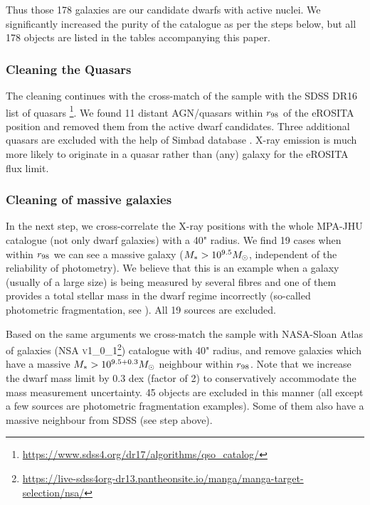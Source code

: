 \documentclass[fleqn,usenatbib]{mnras}
\newcommand{\stmass}{M_{\rm *}}
\newcommand{\msun}{M_\odot}
\begin{document}
Thus those 178 galaxies are our candidate dwarfs with active nuclei.  We significantly increased the purity of the catalogue as per the steps below, but all 178 objects are listed in the tables accompanying this paper.  


\subsubsection*{Cleaning the Quasars}


The cleaning continues with the cross-match of the sample with the SDSS DR16 list of quasars \citep{Lyke2020}\footnote{\url{https://www.sdss4.org/dr17/algorithms/qso_catalog/}}. We found 11 distant AGN/quasars within $r_{\rm 98}$ of the eROSITA position and removed them from the active dwarf candidates. Three additional quasars are excluded with the help of Simbad database \citep{Wenger2000}. X-ray emission is much more likely to originate in a quasar rather than (any) galaxy for the eROSITA flux limit. 


\subsubsection*{Cleaning of massive galaxies}


In the next step, we cross-correlate the X-ray positions with the whole MPA-JHU catalogue (not only dwarf galaxies) with a 40" radius. We find 19 cases when within $r_{\rm 98}$ we can see a massive galaxy ($\stmass > 10^{9.5} \msun$, independent of the reliability of photometry). We believe that this is an example when a galaxy (usually of a large size) is being measured by several fibres and one of them provides a total stellar mass in the dwarf regime incorrectly (so-called photometric fragmentation, see \citealt{Sartori2015, Birchall2020}). All 19 sources are excluded.


Based on the same arguments we cross-match the sample with NASA-Sloan Atlas of galaxies (NSA \textsc{v1\_0\_1}\footnote{\url{https://live-sdss4org-dr13.pantheonsite.io/manga/manga-target-selection/nsa/}}) catalogue with 40" radius, and remove galaxies which have a massive $\stmass > 10^{9.5+0.3} \msun$ neighbour within $r_{\rm 98}$. Note that we increase the dwarf mass limit by 0.3 dex (factor of 2) to conservatively accommodate the mass measurement uncertainty. 45 objects are excluded in this manner (all except a few sources are photometric fragmentation examples). Some of them also have a massive neighbour from SDSS (see step above).
\end{document}
